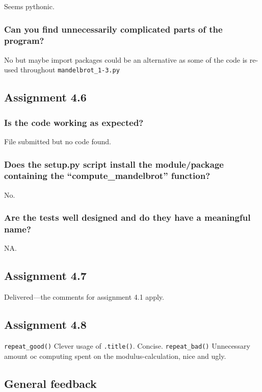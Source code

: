 \documentclass[a4paper]{article}
\begin{document}
Seems pythonic.

\subsubsection*{Can you find unnecessarily complicated parts of the program?}

No but maybe import packages could be an alternative as some of the code is re-used throughout \texttt{mandelbrot_1-3.py}


\subsection*{Assignment 4.6}

\subsubsection*{Is the code working as expected?}
File submitted but no code found.


\subsubsection*{Does the setup.py script install the module/package containing the ``compute\_mandelbrot'' function?}
No.
\subsubsection*{Are the tests well designed and do they have a meaningful name?}
NA.

\subsection*{Assignment 4.7}
Delivered---the comments for assignment 4.1 apply.

\subsection*{Assignment 4.8}
\texttt{repeat\_good()} Clever usage of \texttt{.title()}. Concise.
\texttt{repeat\_bad()} Unnecessary amount oc computing spent on the modulus-calculation, nice and ugly.

\subsection*{General feedback}
\end{document}
